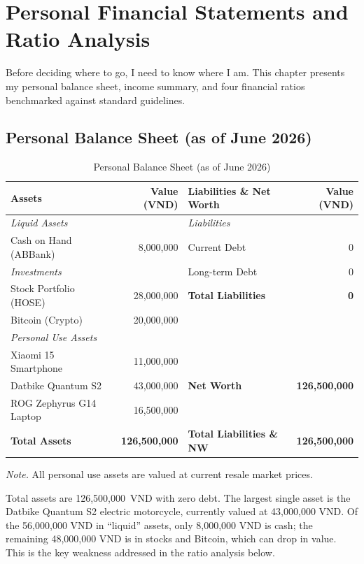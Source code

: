 \chapter{Personal Financial Statements and Ratio Analysis}

Before deciding where to go, I need to know where I am. This chapter presents my personal balance sheet, income summary, and four financial ratios benchmarked against standard guidelines.

\section{Personal Balance Sheet (as of June 2026)}

\begin{table}[h!]
\caption{Personal Balance Sheet (as of June 2026)}
\label{tab:balance_sheet}
\centering
\begin{tabular}{@{}lrlr@{}}
\toprule
\textbf{Assets} & \textbf{Value (VND)} & \textbf{Liabilities \& Net Worth} & \textbf{Value (VND)} \\
\midrule
\textit{Liquid Assets} & & \textit{Liabilities} & \\
Cash on Hand (ABBank) & 8,000,000 & Current Debt & 0 \\
\textit{Investments} & & Long-term Debt & 0 \\
Stock Portfolio (HOSE) & 28,000,000 & \textbf{Total Liabilities} & \textbf{0} \\
Bitcoin (Crypto)       & 20,000,000 & & \\
\textit{Personal Use Assets} & & & \\
Xiaomi 15 Smartphone   & 11,000,000 & & \\
Datbike Quantum S2     & 43,000,000 & \textbf{Net Worth} & \textbf{126,500,000} \\
ROG Zephyrus G14 Laptop & 16,500,000 & & \\
\midrule
\textbf{Total Assets} & \textbf{126,500,000} & \textbf{Total Liabilities \& NW} & \textbf{126,500,000} \\
\bottomrule
\end{tabular}
\end{table}

\textit{Note.} All personal use assets are valued at current resale market prices.

Total assets are 126,500,000~VND with zero debt. The largest single asset is the Datbike Quantum S2 electric motorcycle, currently valued at 43,000,000 VND. Of the 56,000,000 VND in ``liquid'' assets, only 8,000,000 VND is cash; the remaining 48,000,000 VND is in stocks and Bitcoin, which can drop in value. This is the key weakness addressed in the ratio analysis below.

